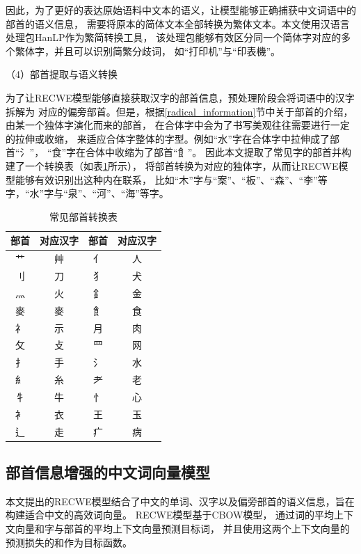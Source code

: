 因此，为了更好的表达原始语料中文本的语义，让模型能够正确捕获中文词语中的部首的语义信息，
需要将原本的简体文本全部转换为繁体文本。本文使用汉语言处理包HanLP作为繁简转换工具，
该处理包能够有效区分同一个简体字对应的多个繁体字，并且可以识别简繁分歧词，
如“打印机”与“印表機”。

（4）部首提取与语义转换

为了让RECWE模型能够直接获取汉字的部首信息，预处理阶段会将词语中的汉字拆解为
对应的偏旁部首。但是，根据\ref{radical_information}节中关于部首的介绍，
由某一个独体字演化而来的部首，
在合体字中会为了书写美观往往需要进行一定的拉伸或收缩，
来适应合体字整体的字型。例如“水”字在合体字中拉伸成了部首“氵”，
“食”字在合体中收缩为了部首“飠”。
因此本文提取了常见字的部首并构建了一个转换表（如表\ref{char_tran_form}所示），
将部首转换为对应的独体字，从而让RECWE模型能够有效识别出这种内在联系，
比如“木”字与“案”、“板”、“森”、“李”等字，“水”字与“泉”、“河”、“海”等字。

\begin{table}[h]
\caption{常见部首转换表}
\begin{tabular}{|c|c|c|c|}
    \hline
    部首 & 对应汉字 & 部首 & 对应汉字 \\
    \hline
    艹 & 艸 & 亻 & 人\\
    \hline
    刂 & 刀 & 犭 & 犬\\
    \hline
    灬 & 火 & 釒 & 金\\
    \hline
    麥 & 麥 & 飠 & 食\\
    \hline
    礻 & 示 & 月 & 肉\\
    \hline
    攵 & 攴 & 罒 & 网\\
    \hline
    扌 & 手 & 氵 & 水\\
    \hline
    糹 & 糸 & 耂 & 老\\
    \hline
    牜 & 牛 & 忄 & 心\\
    \hline
    衤 & 衣 & 王 & 玉\\
    \hline
    辶 & 走 & 疒 & 病\\
    \hline
\end{tabular}
\label{char_tran_form}
\end{table}
\subsection{部首信息增强的中文词向量模型}
\label{recwe_section}
本文提出的RECWE模型结合了中文的单词、汉字以及偏旁部首的语义信息，旨在构建适合中文的高效词向量。
RECWE模型基于CBOW模型，
通过词的平均上下文向量和字与部首的平均上下文向量预测目标词，
并且使用这两个上下文向量的预测损失的和作为目标函数。

